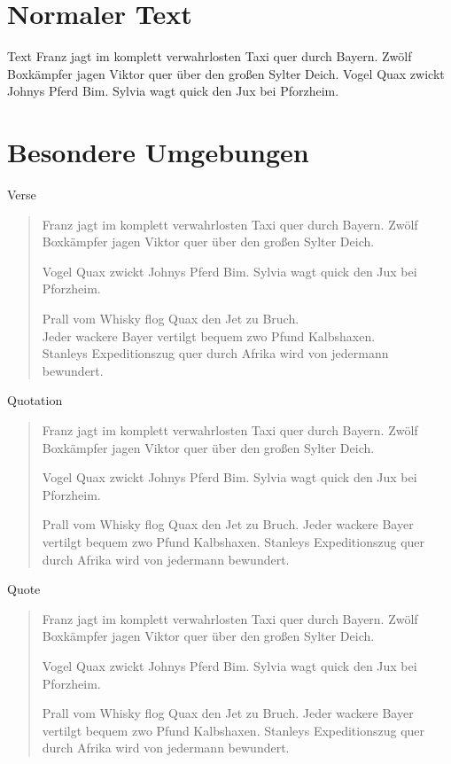 \documentclass[t, aspectratio=169, handout, ngerman]{beamer}
\begin{document}
	\frame{\partpage}

	\section{Normaler Text}

	\begin{frame}{Text}
		Franz jagt im komplett verwahrlosten Taxi quer durch Bayern.
		Zwölf Boxkämpfer jagen Viktor quer über den großen Sylter Deich.
		Vogel Quax zwickt Johnys Pferd Bim.
		Sylvia wagt quick den Jux bei Pforzheim.
	\end{frame}

	\section{Besondere Umgebungen}

	\begin{frame}{Verse}
		\begin{verse}
			Franz jagt im komplett verwahrlosten Taxi quer durch Bayern.
			Zwölf Boxkämpfer jagen Viktor quer über den großen Sylter Deich.

			Vogel Quax zwickt Johnys Pferd Bim.
			Sylvia wagt quick den Jux bei Pforzheim.

			Prall vom Whisky flog Quax den Jet zu Bruch.\\
			Jeder wackere Bayer vertilgt bequem zwo Pfund Kalbshaxen.\\
			Stanleys Expeditionszug quer durch Afrika wird von jedermann bewundert.\\
		\end{verse}
	\end{frame}

	\begin{frame}{Quotation}
		\begin{quotation}
			Franz jagt im komplett verwahrlosten Taxi quer durch Bayern.
			Zwölf Boxkämpfer jagen Viktor quer über den großen Sylter Deich.

			Vogel Quax zwickt Johnys Pferd Bim.
			Sylvia wagt quick den Jux bei Pforzheim.

			Prall vom Whisky flog Quax den Jet zu Bruch.
			Jeder wackere Bayer vertilgt bequem zwo Pfund Kalbshaxen.
			Stanleys Expeditionszug quer durch Afrika wird von jedermann bewundert.
		\end{quotation}
	\end{frame}

	\begin{frame}{Quote}
		\begin{quote}
			Franz jagt im komplett verwahrlosten Taxi quer durch Bayern.
			Zwölf Boxkämpfer jagen Viktor quer über den großen Sylter Deich.

			Vogel Quax zwickt Johnys Pferd Bim.
			Sylvia wagt quick den Jux bei Pforzheim.

			Prall vom Whisky flog Quax den Jet zu Bruch.
			Jeder wackere Bayer vertilgt bequem zwo Pfund Kalbshaxen.
			Stanleys Expeditionszug quer durch Afrika wird von jedermann bewundert.
		\end{quote}
	\end{frame}
\end{document}
